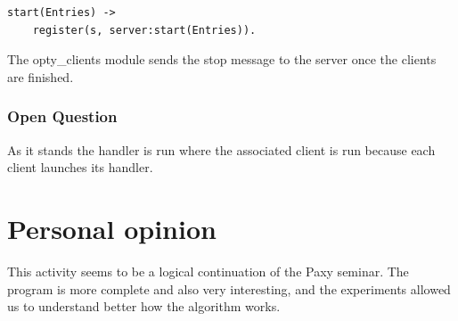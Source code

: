 \documentclass[a4paper, 11pt]{article}
\begin{document}
\begin{lstlisting}
start(Entries) ->
    register(s, server:start(Entries)).
\end{lstlisting}

The opty\_clients module sends the stop message to the server once the clients are finished.

\subsubsection{Open Question}
As it stands the handler is run where the associated client is run because each client launches its handler.

\section{Personal opinion}
This activity seems to be a logical continuation of the Paxy seminar. The program is more complete and also very interesting, and the experiments allowed us to understand better how the algorithm works.
\end{document}
